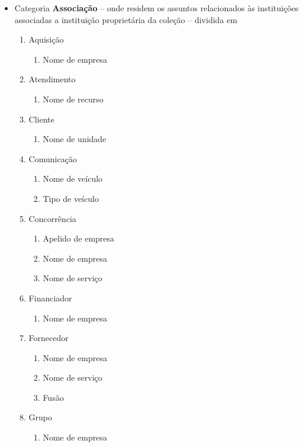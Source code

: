 \begin{multicols}{2}
\begin{itemize}	\item Categoria \textbf{Associação} -- onde residem os assuntos relacionados às instituições associadas a instituição proprietária da coleção -- dividida em	\begin{enumerate} 	\item Aquisição	\begin{enumerate} 	\item Nome de empresa	\end{enumerate}	
			\item Atendimento	\begin{enumerate} 	\item Nome de recurso	\end{enumerate}	
			\item Cliente	\begin{enumerate} 	\item Nome de unidade	\end{enumerate}	
			\item Comunicação	\begin{enumerate} 	\item Nome de veículo		
					\item Tipo de veículo	\end{enumerate}	
			\item Concorrência	\begin{enumerate} 	\item Apelido de empresa		
					\item Nome de empresa		
					\item Nome de serviço	\end{enumerate}	
			\item Financiador	\begin{enumerate} 	\item Nome de empresa	\end{enumerate}	
			\item Fornecedor	\begin{enumerate}			
					\item Nome de empresa		
					\item Nome de serviço		
			\item Fusão			\end{enumerate}	
			\item Grupo	\begin{enumerate} 	\item Nome de empresa	\end{enumerate}	

\end{enumerate}
\end{itemize}
\end{multicols}
